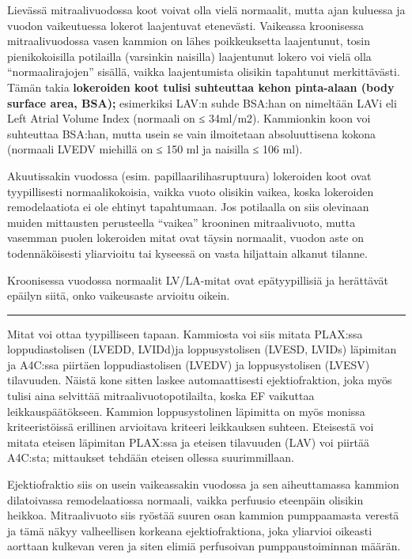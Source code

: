\documentclass[
]{book}
\begin{document}
Lievässä mitraalivuodossa koot voivat olla vielä normaalit, mutta ajan kuluessa ja vuodon vaikeutuessa lokerot laajentuvat etenevästi. Vaikeassa kroonisessa mitraalivuodossa vasen kammion on lähes poikkeuksetta laajentunut, tosin pienikokoisilla potilailla (varsinkin naisilla) laajentunut lokero voi vielä olla ``normaalirajojen'' sisällä, vaikka laajentumista olisikin tapahtunut merkittävästi. Tämän takia \textbf{lokeroiden koot tulisi suhteuttaa kehon pinta-alaan (body surface area, BSA);} esimerkiksi LAV:n suhde BSA:han on nimeltään LAVi eli Left Atrial Volume Index (normaali on ≤ 34ml/m2). Kammionkin koon voi suhteuttaa BSA:han, mutta usein se vain ilmoitetaan absoluuttisena kokona (normaali LVEDV miehillä on ≤ 150 ml ja naisilla ≤ 106 ml).

Akuutissakin vuodossa (esim. papillaarilihasruptuura) lokeroiden koot ovat tyypillisesti normaalikokoisia, vaikka vuoto olisikin vaikea, koska lokeroiden remodelaatiota ei ole ehtinyt tapahtumaan. Jos potilaalla on siis olevinaan muiden mittausten perusteella ``vaikea'' krooninen mitraalivuoto, mutta vasemman puolen lokeroiden mitat ovat täysin normaalit, vuodon aste on todennäköisesti yliarvioitu tai kyseessä on vasta hiljattain alkanut tilanne.

Kroonisessa vuodossa normaalit LV/LA-mitat ovat epätyypillisiä ja herättävät epäilyn siitä, onko vaikeusaste arvioitu oikein.

\begin{center}\rule{0.5\linewidth}{0.5pt}\end{center}

Mitat voi ottaa tyypilliseen tapaan. Kammiosta voi siis mitata PLAX:ssa loppudiastolisen (LVEDD, LVIDd)ja loppusystolisen (LVESD, LVIDs) läpimitan ja A4C:ssa piirtäen loppudiastolisen (LVEDV) ja loppusystolisen (LVESV) tilavuuden. Näistä kone sitten laskee automaattisesti ejektiofraktion, joka myös tulisi aina selvittää mitraalivuotopotilailta, koska EF vaikuttaa leikkauspäätökseen. Kammion loppusystolinen läpimitta on myös monissa kriteeristöissä erillinen arvioitava kriteeri leikkauksen suhteen. Eteisestä voi mitata eteisen läpimitan PLAX:ssa ja eteisen tilavuuden (LAV) voi piirtää A4C:sta; mittaukset tehdään eteisen ollessa suurimmillaan.

Ejektiofraktio siis on usein vaikeassakin vuodossa ja sen aiheuttamassa kammion dilatoivassa remodelaatiossa normaali, vaikka perfuusio eteenpäin olisikin heikkoa. Mitraalivuoto siis ryöstää suuren osan kammion pumppaamasta verestä ja tämä näkyy valheellisen korkeana ejektiofraktiona, joka yliarvioi oikeasti aorttaan kulkevan veren ja siten elimiä perfusoivan pumppaustoiminnan määrän.
\end{document}
